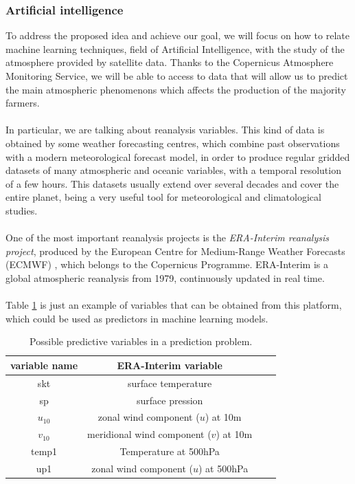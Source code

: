\subsubsection{Artificial intelligence}
To address the proposed idea and achieve our goal, we will focus on how to relate machine learning techniques, field of Artificial Intelligence, with the study of the atmosphere provided by satellite data. Thanks to the Copernicus Atmosphere Monitoring Service, we will be able to access to data that will allow us to predict the main atmospheric phenomenons which affects the production of the majority farmers.\\\\
%
In particular, we are talking about reanalysis variables. This kind of data is obtained by some weather forecasting centres, which combine past observations with a modern meteorological forecast model, in order to produce regular gridded datasets of many atmospheric and oceanic variables, with a temporal resolution of a few hours. This datasets usually extend over several decades and cover the entire planet, being a very useful tool for meteorological and climatological studies.\\\\
%
One of the most important reanalysis projects is the {\em ERA-Interim reanalysis project}, produced by the European Centre for Medium-Range Weather Forecasts (ECMWF) \cite{ERA_Interim}, which belongs to the Copernicus Programme. ERA-Interim is a global atmospheric reanalysis from 1979, continuously updated in real time.\\\\
%
Table \ref{Variables_ERA} is just an example of variables that can be obtained from this platform, which could be used as predictors in machine learning models.

\vspace{12pt}
\begin{table}[H]
\begin{center}
\caption{\label{Variables_ERA} Possible predictive variables in a prediction problem.}
\begin{tabular}{cccc}
\hline
variable name & ERA-Interim variable\\
\hline
\hline
skt & surface temperature\\
sp & surface pression\\
$u_{10}$& zonal wind component ($u$) at 10m\\
$v_{10}$& meridional wind component ($v$) at 10m\\
temp1& Temperature at 500hPa\\
up1& zonal wind component ($u$) at 500hPa\\
\hline
\end{tabular}
\end{center}
\end{table}
\vspace{12pt}

